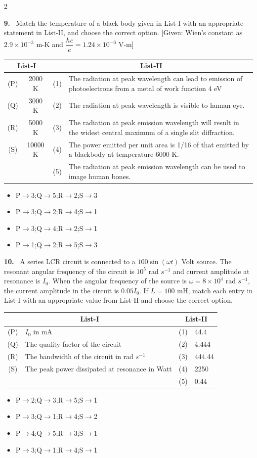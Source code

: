 \documentclass[10pt]{extarticle}
\newcommand{\qn}[1]{\par\smallskip\noindent\textbf{#1.}~}
\newenvironment{qoptions}{\begin{itemize}[leftmargin=1.8em,itemsep=1pt,topsep=2pt,label={}]}{\end{itemize}}
\newcommand{\opt}[2]{\item[(#1)] #2}
\begin{document}
\begin{multicols}{2}
\qn{9} Match the temperature of a black body given in List-I with an appropriate statement in List-II, and choose the correct option. [Given: Wien's constant as $2.9\times10^{-3}$ m-K and $\dfrac{hc}{e}=1.24\times10^{-6}$ V-m]
\begin{center}
\begin{tabular}{|c|c|c|p{4.3cm}|}
\hline
\multicolumn{2}{|c|}{List-I} & \multicolumn{2}{c|}{List-II} \\
\hline
(P) & 2000 K & (1) & The radiation at peak wavelength can lead to emission of photoelectrons from a metal of work function 4 eV \\
\hline
(Q) & 3000 K & (2) & The radiation at peak wavelength is visible to human eye. \\
\hline
(R) & 5000 K & (3) & The radiation at peak emission wavelength will result in the widest central maximum of a single slit diffraction. \\
\hline
(S) & 10000 K & (4) & The power emitted per unit area is 1/16 of that emitted by a blackbody at temperature 6000 K. \\
\hline
 & & (5) & The radiation at peak emission wavelength can be used to image human bones. \\
\hline
\end{tabular}
\end{center}
\begin{qoptions}
\opt{A}{P$\to$3;Q$\to$5;R$\to$2;S$\to$3}
\opt{B}{P$\to$3;Q$\to$2;R$\to$4;S$\to$1}
\opt{C}{P$\to$3;Q$\to$4;R$\to$2;S$\to$1}
\opt{D}{P$\to$1;Q$\to$2;R$\to$5;S$\to$3}
\end{qoptions}

\qn{10} A series LCR circuit is connected to a $100\sin(\omega t)$ Volt source. The resonant angular frequency of the circuit is $10^5$ rad $s^{-1}$ and current amplitude at resonance is $I_0$. When the angular frequency of the source is $\omega=8\times10^4$ rad $s^{-1}$, the current amplitude in the circuit is $0.05I_0$. If $L=100$ mH, match each entry in List-I with an appropriate value from List-II and choose the correct option.
\begin{center}
\begin{tabular}{|c|p{3.5cm}|c|l|}
\hline
\multicolumn{2}{|c|}{List-I} & \multicolumn{2}{c|}{List-II} \\
\hline
(P) & $I_0$ in mA & (1) & 44.4 \\
\hline
(Q) & The quality factor of the circuit & (2) & 4.444 \\
\hline
(R) & The bandwidth of the circuit in rad $s^{-1}$ & (3) & 444.44 \\
\hline
(S) & The peak power dissipated at resonance in Watt & (4) & 2250 \\
\hline
 & & (5) & 0.44 \\
\hline
\end{tabular}
\end{center}
\begin{qoptions}
\opt{A}{P$\to$2;Q$\to$3;R$\to$5;S$\to$1}
\opt{B}{P$\to$3;Q$\to$1;R$\to$4;S$\to$2}
\opt{C}{P$\to$4;Q$\to$5;R$\to$3;S$\to$1}
\opt{D}{P$\to$3;Q$\to$1;R$\to$4;S$\to$1}
\end{qoptions}


\end{multicols}
\end{document}
